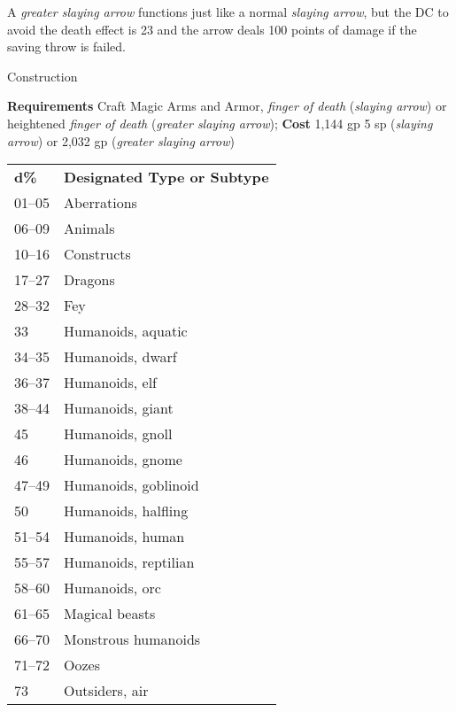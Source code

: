 A \textit{greater slaying arrow} functions just like a normal \textit{slaying arrow}, but the DC to avoid the death effect is 23 and the arrow deals 100 points of damage if the saving throw is failed. 
				
Construction
				
\textbf{Requirements} Craft Magic Arms and Armor, \textit{finger of death} (\textit{slaying arrow}) or heightened\textit{ finger of death} (\textit{greater slaying arrow}); \textbf{Cost }1,144 gp 5 sp (\textit{slaying arrow}) or 2,032 gp (\textit{greater slaying arrow})
\begin{tabular}{ll}
\textbf{d\%} & \textbf{Designated Type or Subtype} \\
01--05        & Aberrations                         \\
06--09        & Animals                             \\
10--16        & Constructs                          \\
17--27        & Dragons                             \\
28--32        & Fey                                 \\
33           & Humanoids, aquatic                  \\
34--35        & Humanoids, dwarf                    \\
36--37        & Humanoids, elf                      \\
38--44        & Humanoids, giant                    \\
45           & Humanoids, gnoll                    \\
46           & Humanoids, gnome                    \\
47--49        & Humanoids, goblinoid                \\
50           & Humanoids, halfling                 \\
51--54        & Humanoids, human                    \\
55--57        & Humanoids, reptilian                \\
58--60        & Humanoids, orc                      \\
61--65        & Magical beasts                      \\
66--70        & Monstrous humanoids                 \\
71--72        & Oozes                               \\
73           & Outsiders, air                      \\

\end{tabular}
